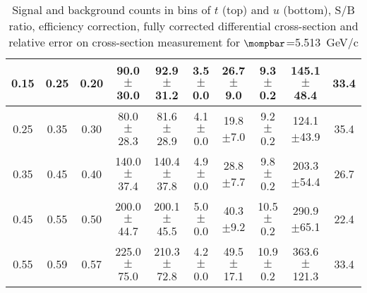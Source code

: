 \begin{landscape}
\begin{table}[hbpt]
\begin{center}
\begin{tabular}{|c|c|c|c|c|c|c|c|c|c|}
 \hline 
 0.15 & 0.25 & 0.20 & 90.0$\pm$30.0 &  92.9$\pm$31.2 &  3.5$\pm$0.0 &  26.7$\pm$9.0 & 9.3$\pm$0.2 &  145.1$\pm$48.4 & 33.4 \\ 
 \hline 
 0.25 & 0.35 & 0.30 & 80.0$\pm$28.3 &  81.6$\pm$28.9 &  4.1$\pm$0.0 &  19.8$\pm$7.0 & 9.2$\pm$0.2 &  124.1$\pm$43.9 & 35.4 \\ 
 \hline 
 0.35 & 0.45 & 0.40 & 140.0$\pm$37.4 &  140.4$\pm$37.8 &  4.9$\pm$0.0 &  28.8$\pm$7.7 & 9.8$\pm$0.2 &  203.3$\pm$54.4 & 26.7 \\ 
 \hline 
 0.45 & 0.55 & 0.50 & 200.0$\pm$44.7 &  200.1$\pm$45.5 &  5.0$\pm$0.0 &  40.3$\pm$9.2 & 10.5$\pm$0.2 &  290.9$\pm$65.1 & 22.4 \\ 
 \hline 
 0.55 & 0.59 & 0.57 & 225.0$\pm$75.0 &  210.3$\pm$72.8 &  4.2$\pm$0.0 &  49.5$\pm$17.1 & 10.9$\pm$0.2 &  363.6$\pm$121.3 & 33.4 \\ 
 \hline 
    \end{tabular}
\caption{Signal and background counts in bins of $t$ (top) and $u$
         (bottom), S/B ratio, efficiency correction, fully corrected
         differential cross-section and relative error on cross-section
         measurement for $\mompbar$=5.513~GeV/c}
  \end{center}
\end{table}
\end{landscape}
